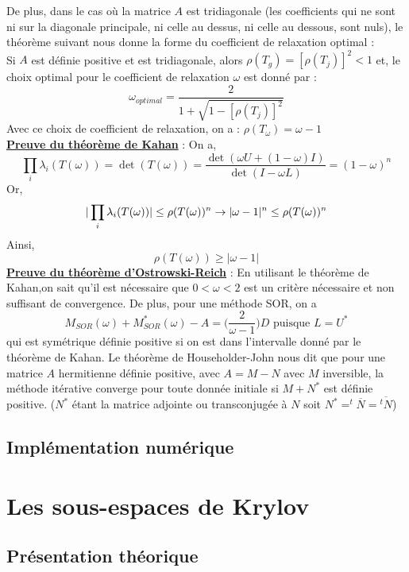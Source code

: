 De plus, dans le cas où la matrice $A$ est tridiagonale (les coefficients qui ne sont ni sur la diagonale principale, ni celle au dessus, ni celle au dessous, sont nuls), le théorème suivant nous donne la forme du coefficient de relaxation optimal :\\

Si $A$ est définie positive et est tridiagonale, alors $\rho(T_g)=[\rho(T_j)]^2<1$ et, le choix optimal pour le coefficient de relaxation $\omega$ est donné par : 
$$
\omega_{optimal}=\frac{2}{1+\sqrt{1-[\rho(T_j)]^2}}
$$
Avec ce choix de coefficient de relaxation, on a : $\rho(T_\omega)=\omega-1$\\
\underline{\textbf{Preuve du théorème de Kahan}} : On a,
$$
\prod\limits_i \lambda_i(T(\omega))=\det(T(\omega))=\frac{\det(\omega U+(1-\omega)I)}{\det(I-\omega L)}=(1-\omega)^n 
$$
Or,
$$
|\prod\limits_i \lambda_i(T(\omega))|\leq\rho(T(\omega))^n \\
\rightarrow |\omega-1|^n\leq\rho(T(\omega))^n\\
$$
Ainsi,
$$
\rho(T(\omega))\geq|\omega-1|
$$
\underline{\textbf{Preuve du théorème d'Ostrowski-Reich}} : En utilisant le théorème de Kahan,on sait qu'il est nécessaire que  $0<\omega<2$ est un critère nécessaire et non suffisant de convergence. De plus, pour une méthode SOR, on a 
$$
M_{SOR}(\omega)+M_{SOR}^*(\omega)-A=\bigg(\frac{2}{\omega-1}\bigg)D \text{ puisque }L=U^*
$$
qui est symétrique définie positive si on est dans l'intervalle donné par le théorème de Kahan. Le théorème de Householder-John nous dit que pour une matrice $A$ hermitienne définie positive, avec $A=M-N$ avec $M$ inversible, la méthode itérative converge pour toute donnée initiale si $M+N^*$ est définie positive. ($N^*$ étant la matrice adjointe ou transconjugée à $N$ soit $N^*=^t\overline{N}=\overline{^tN}$)
\subsection{Implémentation numérique}
\section{Les sous-espaces de Krylov}
\subsection{Présentation théorique}
